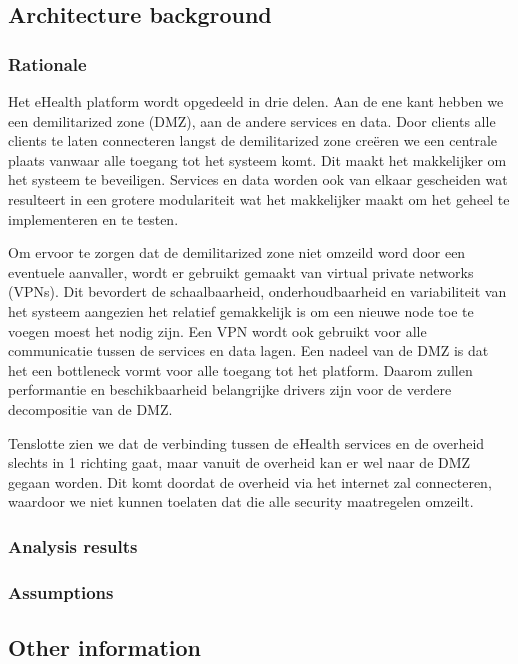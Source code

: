 \documentclass[a4paper,10pt]{paper}
\begin{document}
\subsection{Architecture background}

\subsubsection{Rationale}

Het eHealth platform wordt opgedeeld in drie delen. Aan de ene kant hebben we een demilitarized zone (DMZ), aan de andere services en data. Door clients alle clients te laten connecteren langst de demilitarized zone creëren we een centrale plaats vanwaar alle toegang tot het systeem komt. Dit maakt het makkelijker om het systeem te beveiligen. Services en data worden ook van elkaar gescheiden wat resulteert in een grotere modulariteit wat het makkelijker maakt om het geheel te implementeren en te testen.

Om ervoor te zorgen dat de demilitarized zone niet omzeild word door een eventuele aanvaller, wordt er gebruikt gemaakt van virtual private networks (VPNs). Dit bevordert de schaalbaarheid, onderhoudbaarheid en variabiliteit van het systeem aangezien het relatief gemakkelijk is om een nieuwe node toe te voegen moest het nodig zijn. Een VPN wordt ook gebruikt voor alle communicatie tussen de services en data lagen. Een nadeel van de DMZ is dat het een bottleneck vormt voor alle toegang tot het platform. Daarom zullen performantie en beschikbaarheid belangrijke drivers zijn voor de verdere decompositie van de DMZ.

Tenslotte zien we dat de verbinding tussen de eHealth services en de overheid slechts in 1 richting gaat, maar vanuit de overheid kan er wel naar de DMZ gegaan worden. Dit komt doordat de overheid via het internet zal connecteren, waardoor we niet kunnen toelaten dat die alle security maatregelen omzeilt.

\subsubsection{Analysis results}

\subsubsection{Assumptions}

\subsection{Other information}
\end{document}
